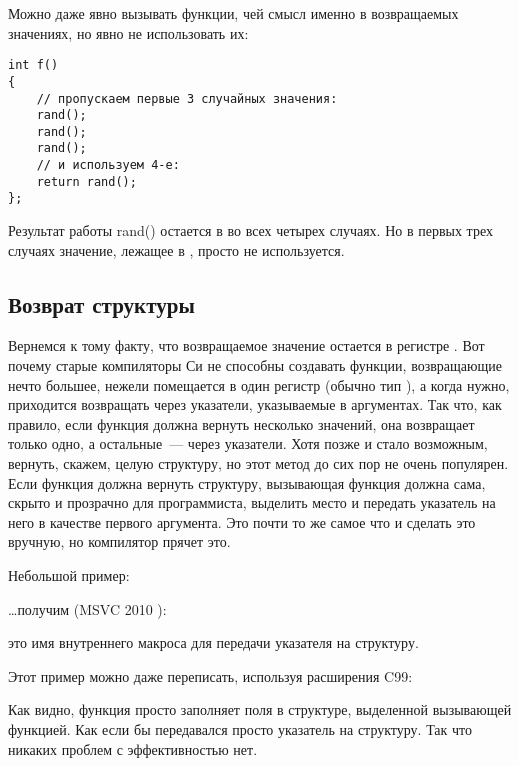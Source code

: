 Можно даже явно вызывать функции, чей смысл именно в возвращаемых значениях, но явно не использовать их:

\begin{lstlisting}[style=customc]
int f()
{
    // пропускаем первые 3 случайных значения:
    rand();
    rand();
    rand();
    // и используем 4-е:
    return rand();
};
\end{lstlisting}

Результат работы rand() остается в \EAX во всех четырех случаях.
Но в первых трех случаях значение, лежащее в \EAX, просто не используется.

\subsection{Возврат структуры}

Вернемся к тому факту, что возвращаемое значение остается в регистре \EAX.
Вот почему старые компиляторы Си не способны создавать функции, возвращающие нечто большее, нежели 
помещается в один регистр (обычно тип \Tint), а когда нужно, приходится возвращать через указатели, указываемые 
в аргументах.
Так что, как правило, если функция должна вернуть несколько значений, она возвращает только одно, 
а остальные~--- через указатели.
Хотя позже и стало возможным, вернуть, скажем, целую структуру, но этот метод до сих пор не 
очень популярен. 
Если функция должна вернуть структуру, вызывающая функция должна сама, скрыто и прозрачно для программиста, 
выделить место и передать указатель на него в качестве первого аргумента. Это почти то же самое 
что и сделать это вручную, но компилятор прячет это.

Небольшой пример:



\dots получим (MSVC 2010 \Ox):



 это имя внутреннего макроса для передачи указателя на структуру.

Этот пример можно даже переписать, используя расширения C99:





Как видно, функция просто заполняет поля в структуре, выделенной вызывающей функцией. 
Как если бы передавался просто указатель на структуру.
Так что никаких проблем с эффективностью нет.

